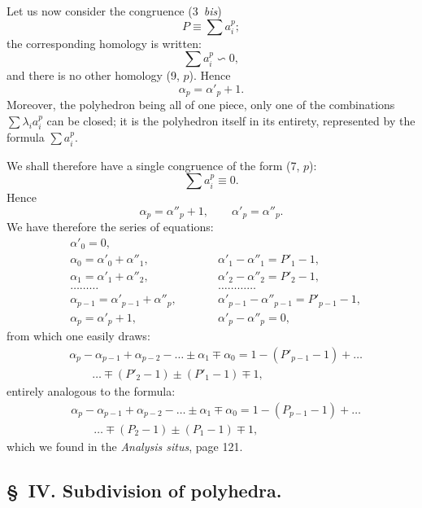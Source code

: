 \documentclass{article}
\begin{document}
Let us now consider the congruence (3~\emph{bis})
\[ P \equiv \sum a^{p}_{i}; \]
the corresponding homology is written:
\[ \sum a^{p}_{i} \backsim 0, \]
and there is no other homology (9, $p$). Hence
\[ \alpha_{p} = \alpha'_{p} + 1. \]
Moreover, the polyhedron being all of one piece, only one of the combinations $\displaystyle\sum \lambda_{i} a^{p}_{i}$ can be closed; it is the polyhedron itself in its entirety, represented by the formula $\displaystyle\sum a^{p}_{i}$.

We shall therefore have a single congruence of the form (7, $p$):
\[ \sum a^{p}_{i} \equiv 0. \]
Hence
\[ \alpha_{p} = \alpha''_{p} + 1, \qquad \alpha'_{p} = \alpha''_{p}. \]
We have therefore the series of equations:
\[ \begin{aligned} &\alpha'_{0} = 0, \\ &\alpha_{0} = \alpha'_{0} + \alpha''_{1}, &&\qquad \alpha'_{1} - \alpha''_{1} = P'_{1} - 1, \\ &\alpha_{1} = \alpha'_{1} + \alpha''_{2}, &&\qquad \alpha'_{2} - \alpha''_{2} = P'_{2} - 1, \\ &\ldots\ldots\ldots &&\qquad \ldots\ldots\ldots\ldots \\ &\alpha_{p-1} = \alpha'_{p-1} + \alpha''_{p}, &&\qquad \alpha'_{p-1} - \alpha''_{p-1} = P'_{p-1} - 1, \\ &\alpha_{p} = \alpha'_{p} + 1, &&\qquad \alpha'_{p} - \alpha''_{p} = 0, \end{aligned} \]
from which one easily draws:
\[ \begin{aligned} &\alpha_{p} - \alpha_{p-1} + \alpha_{p-2} - \ldots \pm \alpha_{1} \mp \alpha_{0} = 1 - (P'_{p-1} - 1) + \ldots \\ &\qquad \ldots \mp (P'_{2} - 1) \pm (P'_{1} - 1) \mp 1, \end{aligned} \]
entirely analogous to the formula:
\[ \begin{aligned} &\alpha_{p} - \alpha_{p-1} + \alpha_{p-2} - \ldots \pm \alpha_{1} \mp \alpha_{0} = 1 - (P_{p-1} - 1) + \ldots \\ &\qquad \ldots \mp (P_{2} - 1) \pm (P_{1} - 1) \mp 1, \end{aligned} \]
which we found in the \emph{Analysis situs}, page 121.

\subsection*{\S~IV. Subdivision of polyhedra.}
\end{document}
